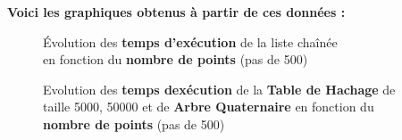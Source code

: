\documentclass[12pt]{extarticle}
\begin{document}
\textbf{Voici les graphiques obtenus à partir de ces données :
}
\

\begin{center}
\begin{figure} [h] %
  \centering %
  \captionsetup{justification=centering} %
  \caption{Évolution des \textbf{temps d'exécution} de la liste chaînée \\ en fonction du \textbf{nombre de points} (pas de 500)} %
  \label{fig:exemple} %
\end{figure}
\end{center}

\begin{center}
\begin{figure} %
  \centering %
  \captionsetup{justification=centering} %
  \caption{Evolution des \textbf{temps dexécution} de la \textbf{Table de Hachage} de taille 5000, 50000 et de \textbf{Arbre Quaternaire} en fonction du \textbf{nombre de points} (pas de 500)} %
  \label{fig:exemple} %
\end{figure}
\end{center} 
\end{document}

